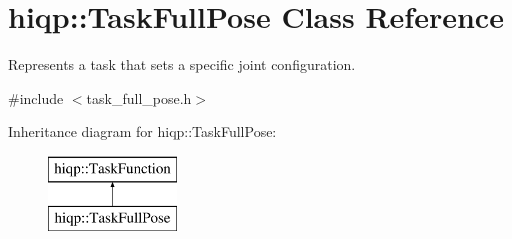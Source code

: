 \hypertarget{classhiqp_1_1TaskFullPose}{\section{hiqp\-:\-:Task\-Full\-Pose Class Reference}
\label{classhiqp_1_1TaskFullPose}
}


Represents a task that sets a specific joint configuration.  




{\ttfamily \#include $<$task\-\_\-full\-\_\-pose.\-h$>$}

Inheritance diagram for hiqp\-:\-:Task\-Full\-Pose\-:\begin{figure}[H]
\begin{center}
\leavevmode
\includegraphics[height=2.000000cm]{classhiqp_1_1TaskFullPose}
\end{center}
\end{figure}
